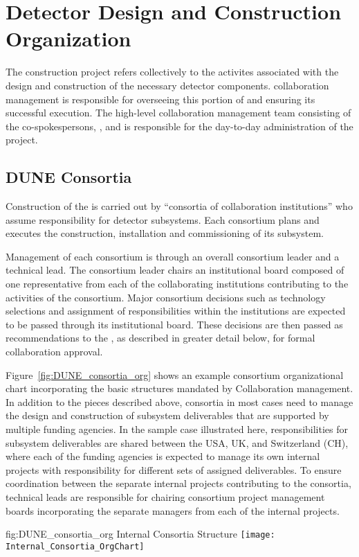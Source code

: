 ﻿\chapter{Detector Design and Construction Organization}
\label{vl:tc-overview}

The   construction project refers collectively 
to the activites associated with the design and construction of the
necessary detector components.   collaboration management 
is responsible for overseeing this portion of  and 
ensuring its successful execution.  The high-level  
collaboration management team consisting of the co-spokespersons, 
, and  is responsible for the day-to-day 
administration of the project.  

\section{DUNE Consortia}
\label{sec:consortia}

Construction of the   is carried out by 
``consortia of collaboration institutions'' who assume responsibility 
for detector subsystems.  Each consortium plans and executes the 
construction, installation and commissioning of its subsystem.

Management of each consortium is through an overall consortium leader 
and a technical lead.  The consortium leader chairs an institutional 
board composed of one representative from each of the collaborating 
institutions contributing to the activities of the consortium.  Major 
consortium decisions such as technology selections and assignment of 
responsibilities within the institutions are expected to be passed 
through its institutional board.  These decisions are then passed 
as recommendations to the  , as described in 
greater detail below, for formal collaboration approval.

Figure~\ref{fig:DUNE_consortia_org} shows an example consortium 
organizational chart incorporating the basic structures mandated 
by  Collaboration management.  In addition to the pieces 
described above, consortia in most cases need to manage the design 
and construction of subsystem deliverables that are supported by 
multiple funding agencies.  In the sample case illustrated here, 
responsibilities for subsystem deliverables are shared between the 
USA, UK, and Switzerland (CH), where each of the funding agencies 
is expected to manage its own internal projects with responsibility 
for different sets of assigned deliverables.  To ensure coordination 
between the separate internal projects contributing to the consortia, 
technical leads are responsible for chairing consortium project 
management boards incorporating the separate managers from each of 
the internal projects.   
\begin{dunefigure}{fig:DUNE_consortia_org}
  { Internal Consortia Structure}
  \texttt{[image: Internal\_Consortia\_OrgChart]}
\end{dunefigure}

